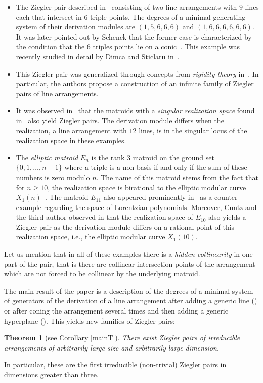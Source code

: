 \documentclass[a4paper,11pt]{amsart}
\numberwithin{equation}{section}
\newtheorem{theorem}{Theorem}[section]
\theoremstyle{remark}
\begin{document}
\begin{itemize}
	\item The Ziegler pair described in~\cite{Ziegler} consisting of two line arrangements with $9$ lines each that intersect in $6$ triple points.
	The degrees of a minimal generating system of their derivation modules are $(1,5,6,6,6)$ and $(1,6,6,6,6,6,6)$.
	It was later pointed out by Schenck that the former case is characterized by the condition that the $6$ triples points lie on a conic~\cite{Sch12}.
	This example was recently studied in detail by Dimca and Sti\-cla\-ru in~\cite{DS24}.
	\item This Ziegler pair was generalized through concepts from \emph{rigidity theory} in~\cite{DST25}. In particular, the authors propose a construction of an infinite family of Ziegler pairs of line arrangements.
	\item It was observed in~\cite{KLP24} that the matroids with a \emph{singular realization space} found in~\cite{CL25} also yield Ziegler pairs.
	The derivation module differs when the realization, a line arrangement with $12$ lines, is in the singular locus of the realization space in these examples.
	\item The \emph{elliptic matroid} $E_n$ is the rank $3$ matroid on the ground set $\{0,1,\ldots,n-1\}$ where a triple is a non-basis if and only if the sum of these numbers is zero modulo $n$.
	The name of this matroid stems from the fact that for $n\ge 10$, the realization space is birational to the elliptic modular curve $X_1(n)$~\cite{BR24}.
	The matroid $E_{11}$ also appeared prominently in~\cite{BHKL25} as a counter-example regarding the space of Lorentzian polynomials.
	Moreover, Cuntz and the third author observed in \cite{CP} that the realization space of $E_{10}$ also yields a Ziegler pair as the derivation module differs on a rational point of this realization space, i.e., the elliptic modular curve $X_1(10)$.
\end{itemize}

Let us mention that in all of these examples there is a \emph{hidden collinearity} in one part of the pair, that is there are collinear intersection points of the arrangement which are not forced to be collinear by the underlying matroid. 

The main result of the paper is a description of the degrees of a minimal system of generators of the derivation of a line arrangement after adding a generic line () or after coning the arrangement several times and then adding a generic hyperplane ().
This yields new families of Ziegler pairs:
\begin{theorem}[see Corollary \ref{mainT}]
There exist Ziegler pairs of irreducible arrangements of arbitrarily large size and arbitrarily large dimension.
\end{theorem}
In particular, these are the first irreducible (non-trivial) Ziegler pairs in dimensions greater than three.
\end{document}
